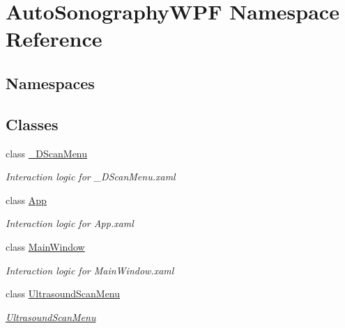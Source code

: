 \hypertarget{namespace_auto_sonography_w_p_f}{}\section{Auto\+Sonography\+W\+PF Namespace Reference}
\label{namespace_auto_sonography_w_p_f}
\subsection*{Namespaces}
\begin{DoxyCompactItemize}
\end{DoxyCompactItemize}
\subsection*{Classes}
\begin{DoxyCompactItemize}
\item 
class \hyperlink{class_auto_sonography_w_p_f_1_1__3_d_scan_menu}{\+\_\+D\+Scan\+Menu}
\begin{DoxyCompactList}\small\item\em Interaction logic for \+\_\+D\+Scan\+Menu.\+xaml \end{DoxyCompactList}\item 
class \hyperlink{class_auto_sonography_w_p_f_1_1_app}{App}
\begin{DoxyCompactList}\small\item\em Interaction logic for App.\+xaml \end{DoxyCompactList}\item 
class \hyperlink{class_auto_sonography_w_p_f_1_1_main_window}{Main\+Window}
\begin{DoxyCompactList}\small\item\em Interaction logic for Main\+Window.\+xaml \end{DoxyCompactList}\item 
class \hyperlink{class_auto_sonography_w_p_f_1_1_ultrasound_scan_menu}{Ultrasound\+Scan\+Menu}
\begin{DoxyCompactList}\small\item\em \hyperlink{class_auto_sonography_w_p_f_1_1_ultrasound_scan_menu}{Ultrasound\+Scan\+Menu} \end{DoxyCompactList}\end{DoxyCompactItemize}
